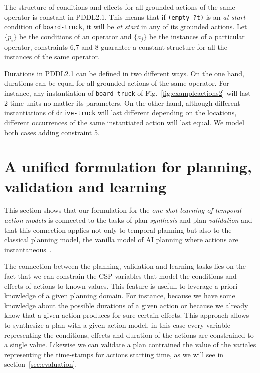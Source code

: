 \documentclass{ecai}
\begin{document}
The structure of conditions and effects for all grounded actions of the same operator is constant in PDDL2.1. This means that if \texttt{(empty ?t)} is an \emph{at start} condition of \texttt{board-truck}, it will be \emph{at start} in any of its grounded actions. Let $\{p_i\}$ be the conditions of an operator and $\{a_j\}$ be the instances of a particular operator, constraints 6,7 and 8 guarantee a constant structure for all the instances of the same operator. 

Durations in PDDL2.1 can be defined in two different ways. On the one hand, durations can be equal for all grounded actions of the same operator. For instance, any instantiation of \texttt{board-truck} of Fig.~\ref{fig:exampleactions2} will last 2 time units no matter its parameters. On the other hand, although different instantiations of \texttt{drive-truck} will last different depending on the locations, different occurrences of the same instantiated action will last equal. We model both cases adding constraint 5.  



\section{A unified formulation for planning, validation and learning}
\label{sec:usingCPValidation}
This section shows that our formulation for the {\em one-shot learning of temporal action models} is connected to the tasks of plan {\em synthesis} and plan {\em validation} and that this connection applies not only to temporal planning but also to the classical planning model, the vanilla model of AI planning where actions are instantaneous~\cite{geffner2013concise}. 

The connection between the planning, validation and learning tasks lies on the fact that we can constrain the CSP variables that model the conditions and effects of actions to known values. This feature is usefull to leverage a priori knowledge of a given planning domain. For instance, because we have some knowledge about the possible durations of a given action or because we already know that a given action produces for sure certain effects.  This approach allows to synthesize a plan with a given action model, in this case every variable representing the conditions, effects and duration of the actions are constrained to a single value. Likewise we can validate a plan contrained the value of the variales representing the time-stamps for actions starting time, as we will see in section~\ref{sec:evaluation}.
\end{document}
